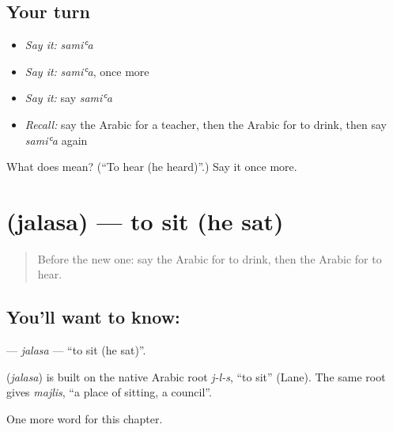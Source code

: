 \subsection*{Your turn}
\begin{itemize}
\raggedright
  \item \emph{Say it:} \emph{samiʿa}
  \item \emph{Say it:} \emph{samiʿa}, once more
  \item \emph{Say it:} say \emph{samiʿa}
  \item \emph{Recall:} say the Arabic for a teacher, then the Arabic for to drink, then say \emph{samiʿa} again
\end{itemize}

\begin{tcolorbox}[breakable,colback=teal!4,colframe=teal!35!black,title={Before you move on}]
What does  mean? (\textquotedblleft{}To hear (he heard)\textquotedblright{}.) Say it once more.
\end{tcolorbox}
\section[\texorpdfstring{\ar{جلس} (jalasa)}{جلس (jalasa)}]{ (jalasa) — to sit (he sat)}

\label{lesson:AR-C57-jalasa}



\begin{quote}
Before the new one: say the Arabic for to drink, then the Arabic for to hear.
\end{quote}

\subsection*{You'll want to know: }
\textbf{} — \emph{jalasa} — \textquotedblleft{}to sit (he sat)\textquotedblright{}.

\begin{cousinweb}
\textbf{} (\emph{jalasa}) is built on the native Arabic root \emph{j-l-s}, \textquotedblleft{}to sit\textquotedblright{} (Lane). The same root gives \emph{majlis}, \textquotedblleft{}a place of sitting, a council\textquotedblright{}.
\end{cousinweb}

\begin{grammarlens}[title={What you've built}]
One more word for this chapter.
\end{grammarlens}

